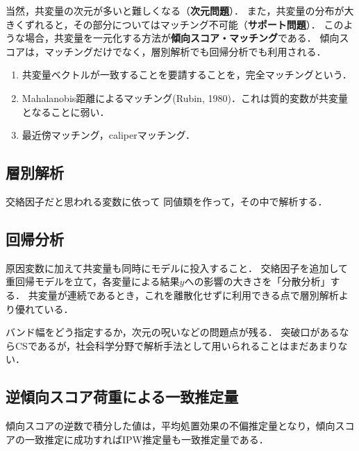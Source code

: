 \documentclass[uplatex,dvipdfmx]{jsreport}
\begin{document}
当然，共変量の次元が多いと難しくなる（\textbf{次元問題}）．
また，共変量の分布が大きくずれると，その部分についてはマッチング不可能（\textbf{サポート問題}）．
このような場合，共変量を一元化する方法が\textbf{傾向スコア・マッチング}である．
傾向スコアは，マッチングだけでなく，層別解析でも回帰分析でも利用される．


\begin{example}\mbox{}
    \begin{enumerate}
        \item 共変量ベクトルが一致することを要請することを，完全マッチングという．
        \item Mahalanobis距離によるマッチング(Rubin, 1980)．これは質的変数が共変量となることに弱い．
        \item 最近傍マッチング，caliperマッチング．
    \end{enumerate}
\end{example}

\subsection{層別解析}

交絡因子だと思われる変数に依って
同値類を作って，その中で解析する．

\subsection{回帰分析}

\begin{example}[共分散分析]
    原因変数に加えて共変量も同時にモデルに投入すること．
    交絡因子を追加して重回帰モデルを立て，各変量による結果$y$への影響の大きさを「分散分析」する．
    共変量が連続であるとき，これを離散化せずに利用できる点で層別解析より優れている．
\end{example}

\begin{example}
    バンド幅をどう指定するか，次元の呪いなどの問題点が残る．
    突破口があるならCSであるが，社会科学分野で解析手法として用いられることはまだあまりない．
\end{example}

\subsection{逆傾向スコア荷重による一致推定量}

\begin{theorem}
    傾向スコアの逆数で積分した値は，平均処置効果の不偏推定量となり，傾向スコアの一致推定に成功すればIPW推定量も一致推定量である．
\end{theorem}
\end{document}
